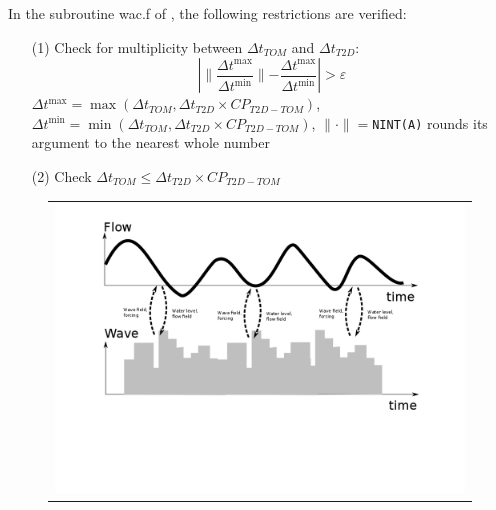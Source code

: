 In the subroutine {\ttfamily wac.f} of \tomawac{}, the following restrictions are verified:
\begin{itemize}
\item[(1)] Check for multiplicity between $\Delta t_{TOM}$ and $\Delta t_{T2D}$:
\begin{equation*}
\left|\parallel\frac{\Delta t^{\max}}{\Delta t^{\min}}\parallel-\frac{\Delta t^{\max}}{\Delta t^{\min}}\right|>\varepsilon %
\end{equation*}
$\Delta t^{\max}=\max{(\Delta t_{TOM}, \Delta t_{T2D} \times CP_{T2D-TOM})}$, $\Delta t^{\min}=\min{(\Delta t_{TOM}, \Delta t_{T2D} \times CP_{T2D-TOM})}$, $\parallel\cdot\parallel=$\texttt{NINT(A)} rounds its argument to the nearest whole number
\item[(2)] Check $\Delta t_{TOM} \leq \Delta t_{T2D} \times CP_{T2D-TOM}$
\end{itemize}

\begin{figure}[H]%
  \begin{center}
    \begin{tabular}{c}
      \includegraphics[scale=0.30]{./graphics/coupling_1.png}
\end{tabular}
\end{center}
\end{figure}

